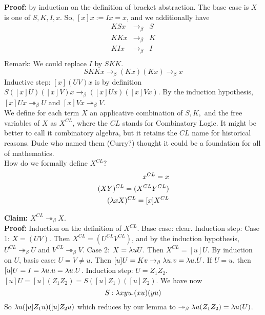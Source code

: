 \textbf{Proof:} by induction on the definition of bracket abstraction. The base case is $X$ is one of $S,K,I,x$. So, $[x]x := Ix = x$, and we additionally have
\begin{eqnarray*}
  KSx &\rightarrow_\beta& S\\
  KKx &\rightarrow_\beta& K\\
  KIx &\rightarrow_\beta& I\\
\end{eqnarray*}
Remark: We could replace $I$ by $SKK$.
\begin{equation*}
  SKKx \rightarrow_\beta (Kx)(Kx) \rightarrow_\beta x
\end{equation*}
Inductive step: $[x](UV)x$ is by definition $S([x]U)([x]V)x \rightarrow_\beta ([x]Ux)([x]Vx)$. By the induction hypothesis, $[x]Ux \twoheadrightarrow_\beta U$ and $[x]Vx \twoheadrightarrow_\beta V$. \qqed\\

We define for each term $X$ an applicative combination of $S, K,$ and the free variables of $X$ as $X^{CL}$, where the $CL$ stands for Combinatory Logic. It might be better to call it combinatory algebra, but it retains the $CL$ name for historical reasons. Dude who named them (Curry?) thought it could be a foundation for all of mathematics.\\

How do we formally define $X^{CL}$?
\begin{eqnarray*}
  x^{CL} = x\\
  (XY)^{CL} = (X^{CL}Y^{CL})\\
  (\lambda xX)^{CL} = [x]X^{CL}
\end{eqnarray*}

\textbf{Claim:} $X^{CL} \twoheadrightarrow_\beta X$.\\

\textbf{Proof:} Induction on the definition of $X^{CL}$. Base case: clear. %
Induction step: Case 1: $X = (UV)$. Then $X^{CL} = (U^{CL}V^{CL})$, and by the induction hypothesis, $U^{CL} \twoheadrightarrow_\beta U$ and $V^{CL} \twoheadrightarrow_\beta V$. Case 2: $X = \lambda uU$. Then $X^{CL} = [u]U$. By induction on $U$, basis case: $U = V \neq u$. Then $[u]U = Kv \rightarrow_\beta \lambda u.v = \lambda u.U$. If $U = u$, then $[u]U = I = \lambda u.u = \lambda u.U$. Induction step: $U = Z_1Z_2$. $[u]U = [u](Z_1Z_2) = S([u]Z_1)([u]Z_2)$. We have now
\begin{equation*}
  S : \lambda xyu.(xu)(yu)
\end{equation*}
So $\lambda u ([u]Z_1u)([u]Z_2u)$ which reduces by our lemma to $\twoheadrightarrow_\beta \lambda u(Z_1Z_2) = \lambda u(U)$.\\

